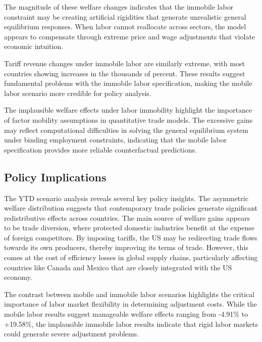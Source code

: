 The magnitude of these welfare changes indicates that the immobile labor constraint may be creating artificial rigidities that generate unrealistic general equilibrium responses. When labor cannot reallocate across sectors, the model appears to compensate through extreme price and wage adjustments that violate economic intuition.

Tariff revenue changes under immobile labor are similarly extreme, with most countries showing increases in the thousands of percent. These results suggest fundamental problems with the immobile labor specification, making the mobile labor scenario more credible for policy analysis.

The implausible welfare effects under labor immobility highlight the importance of factor mobility assumptions in quantitative trade models. The excessive gains may reflect computational difficulties in solving the general equilibrium system under binding employment constraints, indicating that the mobile labor specification provides more reliable counterfactual predictions.
\begin{landscape}
    \vspace*{\fill}
    
    \vspace*{\fill}
\end{landscape}


\subsection{Policy Implications}

The YTD scenario analysis reveals several key policy insights. The asymmetric welfare distribution suggests that contemporary trade policies generate significant redistributive effects across countries. The main source of welfare gains appears to be trade diversion, where protected domestic industries benefit at the expense of foreign competitors. By imposing tariffs, the US may be redirecting trade flows towards its own producers, thereby improving its terms of trade. However, this comes at the cost of efficiency losses in global supply chains, particularly affecting countries like Canada and Mexico that are closely integrated with the US economy.

The contrast between mobile and immobile labor scenarios highlights the critical importance of labor market flexibility in determining adjustment costs. While the mobile labor results suggest manageable welfare effects ranging from -4.91\% to +19.58\%, the implausible immobile labor results indicate that rigid labor markets could generate severe adjustment problems.

